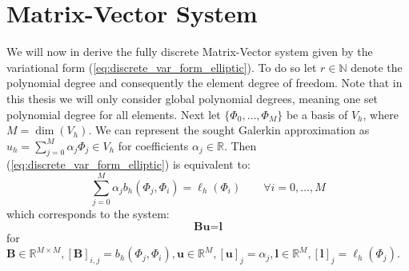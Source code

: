 \section{Matrix-Vector System}
\label{sec:matrix_vect_syst}
We will now in derive the fully discrete Matrix-Vector system given by
the variational form (\ref{eq:discrete_var_form_elliptic}). To do so let
$r \in \mathbb{N}$ denote the polynomial degree and consequently the element degree of freedom.
Note that in this thesis we will only consider global polynomial degrees, meaning one set polynomial degree for all elements.
Next let $\{\Phi_0,\ldots,\Phi_M\}$ be a basis of $V_h$, where $M = \dim(V_h)$.
We can represent the sought Galerkin approximation as $u_h = \sum_{j=0}^{M} \alpha_j \Phi_j\in V_h$ for coefficients
$\alpha_j \in \mathbb{R}$. Then (\ref{eq:discrete_var_form_elliptic}) is equivalent to:
\begin{equation*}
	\sum_{j=0}^{M} \alpha_j b_h(\Phi_j, \Phi_i) = \ell_h(\Phi_i) \qquad \forall i=0,\ldots,M
\end{equation*}
which corresponds to the system:
\begin{equation}
	\label{eq:fully_discrete_dg_system_elliptic}
	\textbf{Bu} = \textbf{l}
\end{equation}
for $ \textbf{B} \in \mathbb{R}^{M\times M}, [\textbf{B}]_{i,j} = b_h(\Phi_j, \Phi_i),
	\textbf{u} \in \mathbb{R}^M, [\textbf{u}]_j = \alpha_j,
	\textbf{l}\in\mathbb{R}^M, [\textbf{l}]_j = \ell_h(\Phi_j)$.

